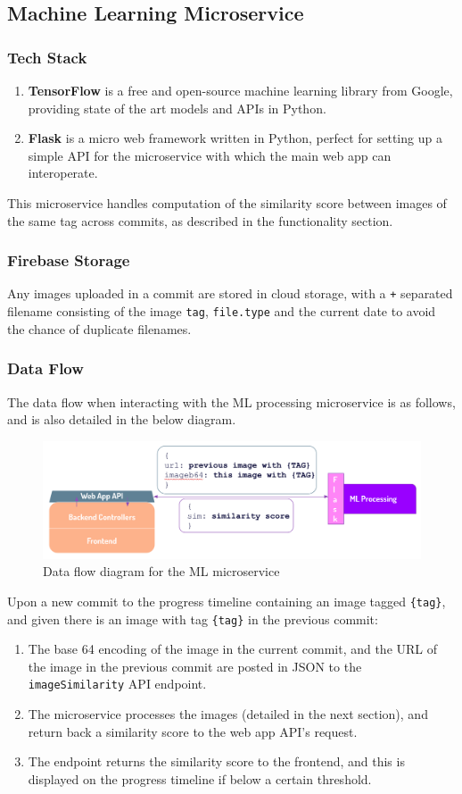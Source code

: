 \documentclass[12pt,a4paper]{article}
\begin{document}
\subsection{Machine Learning Microservice}
\subsubsection{Tech Stack}
\begin{enumerate}
    \item \textbf{TensorFlow} is a free and open-source machine learning library from Google, providing state of the art models and APIs in Python.
    \item \textbf{Flask} is a micro web framework written in Python, perfect for setting up a simple API for the microservice with which the main web app can interoperate. 
\end{enumerate}
This microservice handles computation of the similarity score between images of the same tag across commits, as described in the functionality section.
\subsubsection{Firebase Storage} Any images uploaded in a commit are stored in cloud storage, with a \verb|+| separated filename consisting of the image \verb|tag|, \verb|file.type| and the current date to avoid the chance of duplicate filenames.
\subsubsection{Data Flow} The data flow when interacting with the ML processing microservice is as follows, and is also detailed in the below diagram.
\begin{figure}[H]
    \centering
    \includegraphics[scale=0.45]{ml.png}
    \caption{Data flow diagram for the ML microservice}
\end{figure}
Upon a new commit to the progress timeline containing an image tagged \verb|{tag}|, and given there is an image with tag \verb|{tag}| in the previous commit:
\begin{enumerate}
    \item The base 64 encoding of the image in the current commit, and the URL of the image in the previous commit are posted in JSON to the \verb|imageSimilarity| API endpoint. 
    \item The microservice processes the images (detailed in the next section), and return back a similarity score to the web app API's request.
    \item The endpoint returns the similarity score to the frontend, and this is displayed on the progress timeline if below a certain threshold.
\end{enumerate}
\end{document}
